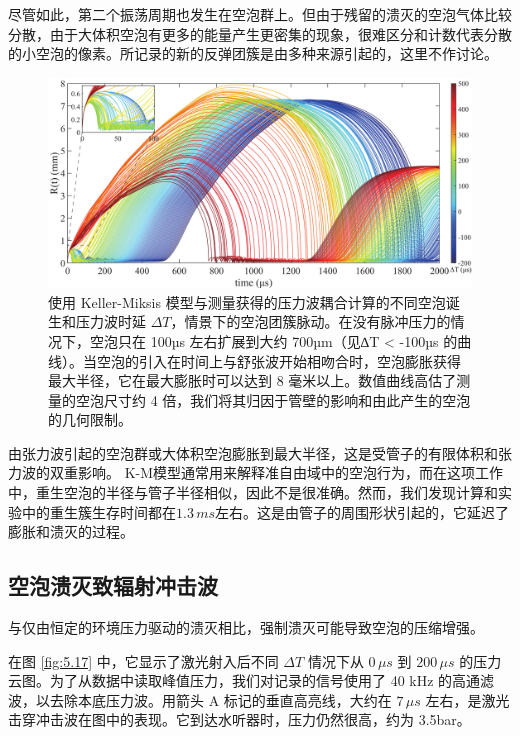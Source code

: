 尽管如此，第二个振荡周期也发生在空泡群上。但由于残留的溃灭的空泡气体比较分散，由于大体积空泡有更多的能量产生更密集的现象，很难区分和计数代表分散的小空泡的像素。所记录的新的反弹团簇是由多种来源引起的，这里不作讨论。

\begin{figure}[H]
  \centering
  \includegraphics[width=1\linewidth]{img/fig5.16.pdf}
  \caption[使用 Keller-Miksis
模型与测量获得的压力波耦合计算的不同空泡诞生和压力波时延
$\Delta T$，情景下的空泡团簇脉动。]{使用 Keller-Miksis
模型与测量获得的压力波耦合计算的不同空泡诞生和压力波时延
$\Delta T$，情景下的空泡团簇脉动。在没有脉冲压力的情况下，空泡只在
100µs 左右扩展到大约 700µm（见∆T \textless{} -100µs
的曲线）。当空泡的引入在时间上与舒张波开始相吻合时，空泡膨胀获得最大半径，它在最大膨胀时可以达到
8 毫米以上。数值曲线高估了测量的空泡尺寸约 4
倍，我们将其归因于管壁的影响和由此产生的空泡的几何限制。}
  \label{fig:5.16}
\end{figure}




由张力波引起的空泡群或大体积空泡膨胀到最大半径，这是受管子的有限体积和张力波的双重影响。
K-M模型通常用来解释准自由域中的空泡行为，而在这项工作中，重生空泡的半径与管子半径相似，因此不是很准确。然而，我们发现计算和实验中的重生簇生存时间都在$1.3\,ms$左右。这是由管子的周围形状引起的，它延迟了膨胀和溃灭的过程。


\subsection{空泡溃灭致辐射冲击波}


与仅由恒定的环境压力驱动的溃灭相比，强制溃灭可能导致空泡的压缩增强。

在图 \ref{fig:5.17} 中，它显示了激光射入后不同 $\Delta T$ 情况下从 $0\,\mu s$
到 $200\,\mu s$
的压力云图。为了从数据中读取峰值压力，我们对记录的信号使用了 40 kHz
的高通滤波，以去除本底压力波。用箭头 A 标记的垂直高亮线，大约在
$7\,\mu s$
左右，是激光击穿冲击波在图中的表现。它到达水听器时，压力仍然很高，约为
3.5bar。

